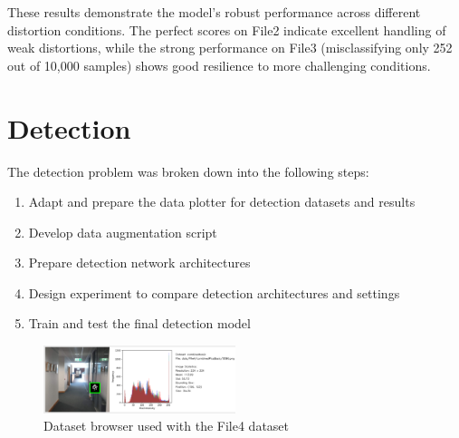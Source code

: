\documentclass[conference]{IEEEtran}
\begin{document}
These results demonstrate the model's robust performance across different distortion conditions. The perfect scores on File2 indicate excellent handling of weak distortions, while the strong performance on File3 (misclassifying only 252 out of 10,000 samples) shows good resilience to more challenging conditions.

\section{Detection}

The detection problem was broken down into the following steps:

\begin{enumerate}
  \item Adapt and prepare the data plotter for detection datasets and results
  \item Develop data augmentation script
  \item Prepare detection network architectures
  \item Design experiment to compare detection architectures and settings
  \item Train and test the final detection model
\end{enumerate}


\begin{figure}[h]
  \centering
  \includegraphics[width=0.5\textwidth]{images/aruco-dataset-browser-2.png}
  \caption{Dataset browser used with the File4 dataset}
  \label{fig:data_browser_2}
\end{figure}
\end{document}
